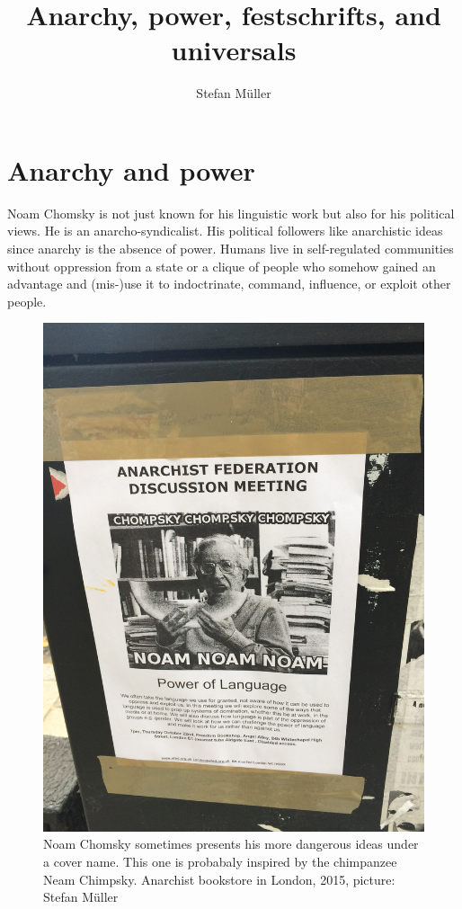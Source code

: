 \documentclass[output=paper,colorlinks,citecolor=brown]{langscibook}
\title{Anarchy, power, festschrifts, and universals}
\author{Stefan Müller\orcid{0000-0003-4413-5313}\affiliation{Humboldt-Universität zu Berlin}}
\begin{document}
\maketitle

\section{Anarchy and power} 

Noam Chomsky is not just known for his linguistic work but also for his political views. He is an
anarcho-syndicalist. His political followers like anarchistic ideas since anarchy is the absence of
power. Humans live in self-regulated communities without oppression from a state or a clique of
people who somehow gained an advantage and (mis-)use it to indoctrinate, command, influence, or
exploit other people.

\begin{figure}
\includegraphics[width=\linewidth]{figures/Chompsky-Anarchist-Bookstore-20151017-11-19-16.jpg}
\caption{Noam Chomsky sometimes presents his more dangerous ideas under a cover name. This one is
  probabaly inspired by the chimpanzee Neam Chimpsky. Anarchist
  bookstore in London, 2015, picture: Stefan Müller}
\end{figure}
\end{document}

